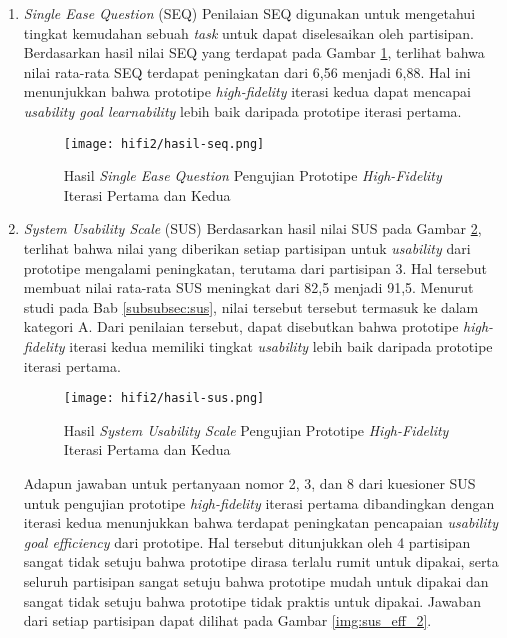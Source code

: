 
\begin{enumerate}
  \item \textit{Single Ease Question} (SEQ)
  \subitem  Penilaian SEQ digunakan untuk mengetahui tingkat kemudahan sebuah \textit{task} untuk dapat diselesaikan oleh partisipan. Berdasarkan hasil nilai SEQ yang terdapat pada Gambar \ref{img:seq_2}, terlihat bahwa nilai rata-rata SEQ terdapat peningkatan dari 6,56 menjadi 6,88. Hal ini menunjukkan bahwa prototipe \textit{high-fidelity} iterasi kedua dapat mencapai \textit{usability goal learnability} lebih baik daripada prototipe iterasi pertama. 

  \begin{figure}[h]
    \centering
    \texttt{[image: hifi2/hasil-seq.png]}
    \caption{Hasil \textit{Single Ease Question} Pengujian Prototipe \textit{High-Fidelity} Iterasi Pertama dan Kedua}
    \label{img:seq_2}
  \end{figure}
  \FloatBarrier

  \item \textit{System Usability Scale} (SUS)
  \subitem  Berdasarkan hasil nilai SUS pada Gambar \ref{img:sus_2}, terlihat bahwa nilai yang diberikan setiap partisipan untuk \textit{usability} dari prototipe mengalami peningkatan, terutama dari partisipan 3. Hal tersebut membuat nilai rata-rata SUS meningkat dari 82,5 menjadi 91,5. Menurut studi pada Bab \ref{subsubsec:sus}, nilai tersebut tersebut termasuk ke dalam kategori A. Dari penilaian tersebut, dapat disebutkan bahwa prototipe \textit{high-fidelity} iterasi kedua memiliki tingkat \textit{usability} lebih baik daripada prototipe iterasi pertama.

  \begin{figure}[h]
    \centering
    \texttt{[image: hifi2/hasil-sus.png]}
    \caption{Hasil \textit{System Usability Scale} Pengujian Prototipe \textit{High-Fidelity} Iterasi Pertama dan Kedua}
    \label{img:sus_2}
  \end{figure}
  \FloatBarrier

  Adapun jawaban untuk pertanyaan nomor 2, 3, dan 8 dari kuesioner SUS untuk pengujian prototipe \textit{high-fidelity} iterasi pertama dibandingkan dengan iterasi kedua menunjukkan bahwa terdapat peningkatan pencapaian \textit{usability goal efficiency} dari prototipe. Hal tersebut ditunjukkan oleh 4 partisipan sangat tidak setuju bahwa prototipe dirasa terlalu rumit untuk dipakai, serta seluruh partisipan sangat setuju bahwa prototipe mudah untuk dipakai dan sangat tidak setuju bahwa prototipe tidak praktis untuk dipakai. Jawaban dari setiap partisipan dapat dilihat pada Gambar \ref{img:sus_eff_2}.


\end{enumerate}
